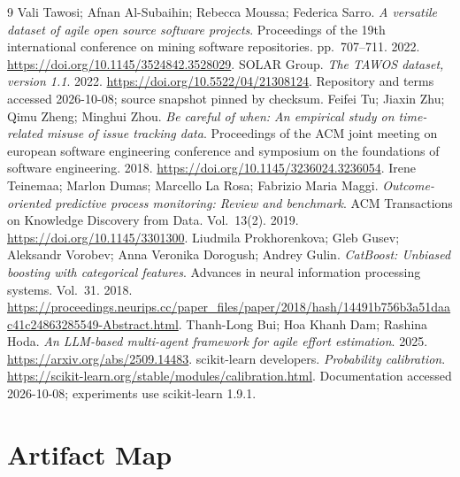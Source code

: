 \documentclass[11pt,a4paper]{article}
\begin{document}
\begin{thebibliography}{9}
 Vali Tawosi; Afnan Al-Subaihin; Rebecca Moussa; Federica Sarro. \emph{A versatile dataset of agile open source software projects}. Proceedings of the 19th international conference on mining software repositories. pp.~707--711. 2022. \url{https://doi.org/10.1145/3524842.3528029}.
 SOLAR Group. \emph{The TAWOS dataset, version 1.1}. 2022. \url{https://doi.org/10.5522/04/21308124}. Repository and terms accessed 2026-10-08; source snapshot pinned by checksum.
 Feifei Tu; Jiaxin Zhu; Qimu Zheng; Minghui Zhou. \emph{Be careful of when: An empirical study on time-related misuse of issue tracking data}. Proceedings of the ACM joint meeting on european software engineering conference and symposium on the foundations of software engineering. 2018. \url{https://doi.org/10.1145/3236024.3236054}.
 Irene Teinemaa; Marlon Dumas; Marcello La Rosa; Fabrizio Maria Maggi. \emph{Outcome-oriented predictive process monitoring: Review and benchmark}. ACM Transactions on Knowledge Discovery from Data. Vol.~13(2). 2019. \url{https://doi.org/10.1145/3301300}.
 Liudmila Prokhorenkova; Gleb Gusev; Aleksandr Vorobev; Anna Veronika Dorogush; Andrey Gulin. \emph{CatBoost: Unbiased boosting with categorical features}. Advances in neural information processing systems. Vol.~31. 2018. \url{https://proceedings.neurips.cc/paper_files/paper/2018/hash/14491b756b3a51daac41c24863285549-Abstract.html}.
 Thanh-Long Bui; Hoa Khanh Dam; Rashina Hoda. \emph{An LLM-based multi-agent framework for agile effort estimation}. 2025. \url{https://arxiv.org/abs/2509.14483}.
 scikit-learn developers. \emph{Probability calibration}. \url{https://scikit-learn.org/stable/modules/calibration.html}. Documentation accessed 2026-10-08; experiments use scikit-learn 1.9.1.
\end{thebibliography}

\appendix
\section{Artifact Map}\label{artifact-map}
\end{document}
